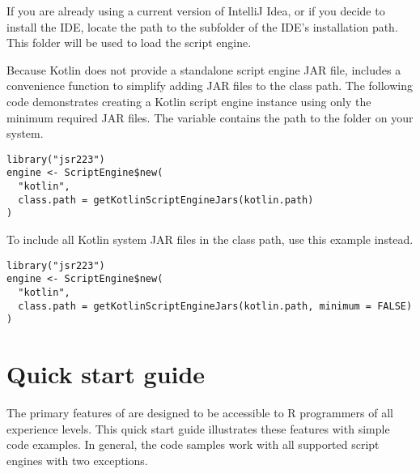 If you are already using a current version of IntelliJ Idea, or if you decide to install the IDE, locate the path to the  subfolder of the IDE's installation path. This folder will be used to load the script engine.

Because Kotlin does not provide a standalone script engine JAR file,  includes a convenience function  to simplify adding JAR files to the class path. The following code demonstrates creating a Kotlin script engine instance using only the minimum required JAR files. The  variable contains the path to the  folder on your system.

\begin{verbatim}
library("jsr223")
engine <- ScriptEngine$new(
  "kotlin",
  class.path = getKotlinScriptEngineJars(kotlin.path)
)
\end{verbatim}
To include all Kotlin system JAR files in the class path, use this example instead.

\begin{verbatim}
library("jsr223")
engine <- ScriptEngine$new(
  "kotlin",
  class.path = getKotlinScriptEngineJars(kotlin.path, minimum = FALSE)
)
\end{verbatim}


\hypertarget{quickstartguide}{\section{Quick start guide}}

The primary features of  are designed to be accessible to R programmers of all experience levels. This quick start guide illustrates these features with simple code examples. In general, the code samples work with all supported script engines with two exceptions.

